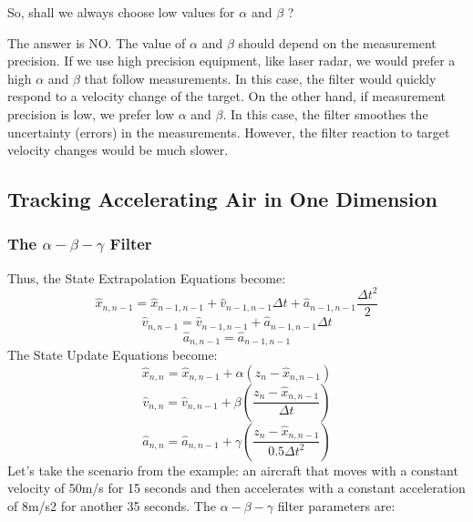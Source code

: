 \documentclass[eng]{ajceam-class}
\begin{document}
So, shall we always choose low values for ${\alpha}$ and ${\beta}$ ?

The answer is NO. The value of ${\alpha}$ and ${\beta}$ should depend on the measurement precision. If we use high precision equipment, like laser radar, we would prefer a high ${\alpha}$ and ${\beta}$ that follow measurements. In this case, the filter would quickly respond to a velocity change of the target. On the other hand, if measurement precision is low, we prefer low ${\alpha}$ and ${\beta}$. In this case, the filter smoothes the uncertainty (errors) in the measurements. However, the filter reaction to target velocity changes would be much slower.

\subsection{Tracking Accelerating Air in One Dimension}
\subsubsection{The ${\alpha - \beta - \gamma}$ Filter}
Thus, the State Extrapolation Equations become:
$$
\hat{x}_{n,n-1} = \hat{x}_{n-1,n-1} + \hat{v}_{n-1,n-1}{\Delta t} + \hat{a}_{n-1,n-1}\frac{{\Delta t^2}}{2}
$$
$$
\hat{v}_{n,n-1} = \hat{v}_{n-1,n-1} + \hat{a}_{n-1,n-1}{\Delta t}
$$
$$
\hat{a}_{n,n-1} = \hat{a}_{n-1,n-1}
$$
The State Update Equations become:
$$
\hat{x}_{n,n} = \hat{x}_{n,n-1} + {\alpha}({z}_{n} - \hat{x}_{n,n-1})
$$
$$
\hat{v}_{n,n} = \hat{v}_{n,n-1} + {\beta}(\frac{{z}_{n} - \hat{x}_{n,n-1}}{\Delta t})
$$
$$
\hat{a}_{n,n} = \hat{a}_{n,n-1} + {\gamma}(\frac{{z}_{n} - \hat{x}_{n,n-1}}{0.5\Delta t^2})
$$
Let's take the scenario from the example: an aircraft that moves with a constant velocity of 50m/s for 15 seconds and then accelerates with a constant acceleration of 8m/s2 for another 35 seconds.
The ${\alpha - \beta - \gamma}$ filter parameters are:
\end{document}
